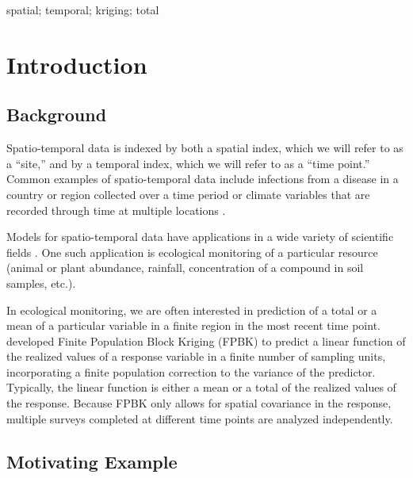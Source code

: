 \documentclass[]{interact}
\theoremstyle{plain}%
\theoremstyle{definition}
\theoremstyle{remark}
\begin{document}
\begin{keywords}
spatial; temporal; kriging; total
\end{keywords}

\section{Introduction}

\subsection{Background}

Spatio-temporal data is indexed by both a spatial index, which we will
refer to as a ``site,'' and by a temporal index, which we will refer to
as a ``time point.'' Common examples of spatio-temporal data include
infections from a disease in a country or region collected over a time
period \citep[e.g.][]{martinez2008autoregressive, sahu2022bayesian} or
climate variables that are recorded through time at multiple locations
\citep{lemos2009spatio}.

Models for spatio-temporal data have applications in a wide variety of
scientific fields \citep[see][ for many examples]{wikle2019spatio}. One
such application is ecological monitoring of a particular resource
(animal or plant abundance, rainfall, concentration of a compound in
soil samples, etc.).

In ecological monitoring, we are often interested in prediction of a
total or a mean of a particular variable in a finite region in the most
recent time point. \citet{ver2008spatial} developed Finite Population
Block Kriging (FPBK) to predict a linear function of the realized values
of a response variable in a finite number of sampling units,
incorporating a finite population correction to the variance of the
predictor. Typically, the linear function is either a mean or a total of
the realized values of the response. Because FPBK only allows for
spatial covariance in the response, multiple surveys completed at
different time points are analyzed independently.

\subsection{Motivating Example}
\end{document}
